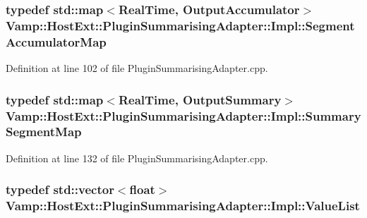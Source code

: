 \subsubsection[{\texorpdfstring{Segment\+Accumulator\+Map}{SegmentAccumulatorMap}}]{\setlength{\rightskip}{0pt plus 5cm}typedef {\bf std\+::map}$<${\bf Real\+Time}, {\bf Output\+Accumulator}$>$ {\bf Vamp\+::\+Host\+Ext\+::\+Plugin\+Summarising\+Adapter\+::\+Impl\+::\+Segment\+Accumulator\+Map}\hspace{0.3cm}{\ttfamily [protected]}}\hypertarget{class_vamp_1_1_host_ext_1_1_plugin_summarising_adapter_1_1_impl_a49b782f5fabb302640daece89cad6a1e}{}\label{class_vamp_1_1_host_ext_1_1_plugin_summarising_adapter_1_1_impl_a49b782f5fabb302640daece89cad6a1e}


Definition at line 102 of file Plugin\+Summarising\+Adapter.\+cpp.

\subsubsection[{\texorpdfstring{Summary\+Segment\+Map}{SummarySegmentMap}}]{\setlength{\rightskip}{0pt plus 5cm}typedef {\bf std\+::map}$<${\bf Real\+Time}, {\bf Output\+Summary}$>$ {\bf Vamp\+::\+Host\+Ext\+::\+Plugin\+Summarising\+Adapter\+::\+Impl\+::\+Summary\+Segment\+Map}\hspace{0.3cm}{\ttfamily [protected]}}\hypertarget{class_vamp_1_1_host_ext_1_1_plugin_summarising_adapter_1_1_impl_a4d77f4954b0378a9b589c29a0b1c286d}{}\label{class_vamp_1_1_host_ext_1_1_plugin_summarising_adapter_1_1_impl_a4d77f4954b0378a9b589c29a0b1c286d}


Definition at line 132 of file Plugin\+Summarising\+Adapter.\+cpp.

\subsubsection[{\texorpdfstring{Value\+List}{ValueList}}]{\setlength{\rightskip}{0pt plus 5cm}typedef std\+::vector$<$float$>$ {\bf Vamp\+::\+Host\+Ext\+::\+Plugin\+Summarising\+Adapter\+::\+Impl\+::\+Value\+List}\hspace{0.3cm}{\ttfamily [protected]}}\hypertarget{class_vamp_1_1_host_ext_1_1_plugin_summarising_adapter_1_1_impl_a1b882efc9db48427875cb1274478e91d}{}\label{class_vamp_1_1_host_ext_1_1_plugin_summarising_adapter_1_1_impl_a1b882efc9db48427875cb1274478e91d}


